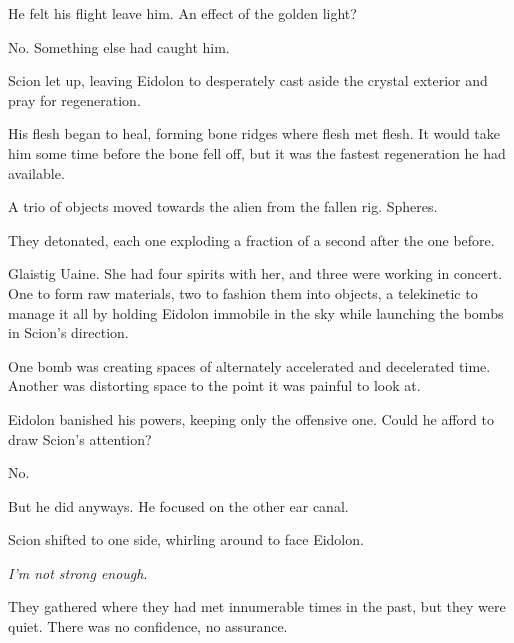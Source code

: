 He felt his flight leave him.  An effect of the golden light?



No.  Something else had caught him.



Scion let up, leaving Eidolon to desperately cast aside the crystal exterior and pray for regeneration.



His flesh began to heal, forming bone ridges where flesh met flesh.  It would take him some time before the bone fell off, but it was the fastest regeneration he had available.



A trio of objects moved towards the alien from the fallen rig.  Spheres.



They detonated, each one exploding a fraction of a second after the one before.



Glaistig Uaine.  She had four spirits with her, and three were working in concert. One to form raw materials, two to fashion them into objects, a telekinetic to manage it all by holding Eidolon immobile in the sky while launching the bombs in Scion's direction.



One bomb was creating spaces of alternately accelerated and decelerated time.  Another was distorting space to the point it was painful to look at.



Eidolon banished his powers, keeping only the offensive one.  Could he afford to draw Scion's attention?



No.



But he did anyways.  He focused on the other ear canal.



Scion shifted to one side, whirling around to face Eidolon.



\emph{I'm not strong enough}.



\blacksquare






They gathered where they had met innumerable times in the past, but they were quiet.  There was no confidence, no assurance.



